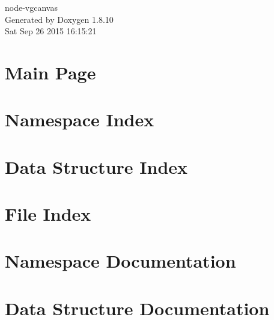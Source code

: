\documentclass[twoside]{book}
\newcommand{\+}{\discretionary{\mbox{\scriptsize$\hookleftarrow$}}{}{}}
\newcommand{\clearemptydoublepage}{%
  \newpage{\pagestyle{empty}\cleardoublepage}%
}
\begin{document}
\hypersetup{pageanchor=false,
             bookmarks=true,
             bookmarksnumbered=true,
             pdfencoding=unicode
            }
\begin{titlepage}
\vspace*{7cm}
\begin{center}%
{\Large node-\/vgcanvas }\\
\vspace*{1cm}
{\large Generated by Doxygen 1.8.10}\\
\vspace*{0.5cm}
{\small Sat Sep 26 2015 16:15:21}\\
\end{center}
\end{titlepage}
\clearemptydoublepage
\tableofcontents
\clearemptydoublepage
{}
\hypersetup{pageanchor=true}

\chapter{Main Page}
\label{index}\hypertarget{index}{}
\chapter{Namespace Index}

\chapter{Data Structure Index}

\chapter{File Index}

\chapter{Namespace Documentation}

\chapter{Data Structure Documentation}





\end{document}
